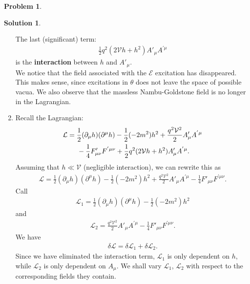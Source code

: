 \documentclass{book}
\numberwithin{equation}{section}
\theoremstyle{definition}
\newtheorem{prob}{Problem}[section]
\newtheorem{sln}{Solution}[section]
\newcommand{\p}{\partial}
\newcommand{\lag}{\mathcal{L}}
\newcommand{\E}{\mathcal{E}}
\newcommand{\V}{\mathcal{V}}
\begin{document}
\begin{prob}
\begin{sln}
\begin{enumerate}
				The last (significant) term:
				\begin{align}
				\boxed{\frac{1}{2}q^2(2\V h + h^2)A'_\mu A^{'\mu}}
				\end{align}
				is the \textbf{interaction} between $h$ and $A'_\mu$.\\
				
				We notice that the field associated with the $\E$ excitation has disappeared. This makes sense, since excitations in $\theta$ does not leave the space of possible vacua. We also observe that the massless Nambu-Goldstone field is no longer in the Lagrangian.\\
				
				
				
				
				
				
				
				
				
				\item Recall the Lagrangian:
				\begin{align}
				\lag &= \frac{1}{2}(\p_\mu h)(\p^\mu h) - \frac{1}{2}(-2m^2)h^2 + \frac{q^2\V^2}{2}A'_\mu A^{'\mu}\nonumber\\ 
				&\hspace{0.5cm} - \frac{1}{4}F'_{\mu\nu}F^{'\mu\nu} + \frac{1}{2}q^2(2\V h + h^2)A'_\mu A^{'\mu}.
				\end{align}
				Assuming that $h \ll \V$ (negligible interaction), we can rewrite this as
				\begin{align}
				\lag = \frac{1}{2}(\p_\mu h)(\p^\mu h) - \frac{1}{2}(-2m^2)h^2 + \frac{q^2\V^2}{2}A'_\mu A^{'\mu} - \frac{1}{4}F'_{\mu\nu}F^{'\mu\nu}.
				\end{align}
				Call
				\begin{align}
				\lag_1 = \frac{1}{2}(\p_\mu h)(\p^\mu h) - \frac{1}{2}(-2m^2)h^2  
				\end{align}
				and 
				\begin{align}
				\lag_2 = \frac{q^2\V^2}{2}A'_\mu A^{'\mu} - \frac{1}{4}F'_{\mu\nu}F^{'\mu\nu}.
				\end{align}
				We have
				\begin{align}
				\delta \lag = \delta \lag_1 + \delta \lag_2.
				\end{align}
				Since we have eliminated the interaction term, $\lag_1$ is only dependent on $h$, while $\lag_2$ is only dependent on $A_\mu$. We shall vary $\lag_1$, $\lag_2$ with respect to the corresponding fields they contain.\\
				

\end{enumerate}
\end{sln}
\end{prob}
\end{document}
